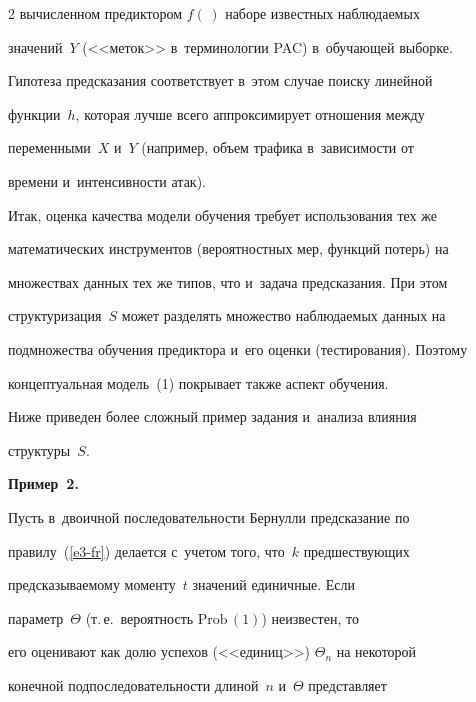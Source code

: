 \begin{multicols}{2}
вычисленном предиктором $f(\,)$ наборе известных наблюдаемых 


значений~$Y$ (<<меток>> в~терминологии PAC) в~обуча\-ющей выборке. 


Гипотеза пред\-ска\-за\-ния соответствует в~этом случае поиску линейной 


функции~$h$, которая луч\-ше всего аппроксимирует отношения между 


переменными~$X$ и~$Y$ (например, объем трафика в~за\-ви\-си\-мости от 


времени и~ин\-тен\-сив\-ности атак).


  


  Итак, оценка качества модели обучения требует использования тех же 


математических инструментов (вероятностных мер, функций потерь) на 


множествах данных тех же типов, что и~задача предсказания. При этом 


структуризация~$S$ может разделять множество наблюдаемых данных на 


подмножества обучения предиктора и~его оценки (тестирования). Поэтому 


концептуальная модель~(1) покрывает также аспект обучения. 


  


  Ниже приведен более сложный пример задания и~анализа влияния 


структуры~$S$. 





\smallskip





\noindent


  \textbf{Пример~2.}


  


  Пусть в~двоичной последовательности Бернулли предсказание по 


правилу~(\ref{e3-fr}) делается с~учетом того, что~$k$ предшествующих 


предсказываемому моменту~$t$ значений единичные. Если 


параметр~$\Theta$ (т.\,е.\ вероятность $\mathrm{Prob}\,(1)$) неизвестен, то 


его оценивают как долю успехов (<<единиц>>) $\Theta_n$ на некоторой 


конечной подпоследовательности длиной~$n$ и~$\Theta$ представляет 



\end{multicols}
